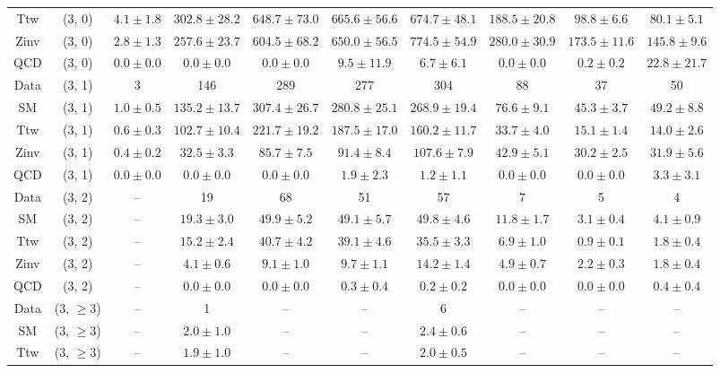 \begin{table}[h!]
{\begin{tabular}{cccccccccc}
	Ttw & (3, 0) & $4.1\pm 1.8$ & $302.8\pm 28.2$ & $648.7\pm 73.0$ & $665.6\pm 56.6$ & $674.7\pm 48.1$ & $188.5\pm 20.8$ & $98.8\pm 6.6$ & $80.1\pm 5.1$ \\[0.5ex] 
	Zinv & (3, 0) & $2.8\pm 1.3$ & $257.6\pm 23.7$ & $604.5\pm 68.2$ & $650.0\pm 56.5$ & $774.5\pm 54.9$ & $280.0\pm 30.9$ & $173.5\pm 11.6$ & $145.8\pm 9.6$ \\[0.5ex] 
	QCD & (3, 0) & $0.0\pm 0.0$ & $0.0\pm 0.0$ & $0.0\pm 0.0$ & $9.5\pm 11.9$ & $6.7\pm 6.1$ & $0.0\pm 0.0$ & $0.2\pm 0.2$ & $22.8\pm 21.7$ \\[0.5ex] 
	Data & (3, 1) & 3 & 146 & 289 & 277 & 304 & 88 & 37 & 50 \\[0.5ex] 
	SM & (3, 1) & $1.0\pm 0.5$ & $135.2\pm 13.7$ & $307.4\pm 26.7$ & $280.8\pm 25.1$ & $268.9\pm 19.4$ & $76.6\pm 9.1$ & $45.3\pm 3.7$ & $49.2\pm 8.8$ \\[0.5ex] 
	Ttw & (3, 1) & $0.6\pm 0.3$ & $102.7\pm 10.4$ & $221.7\pm 19.2$ & $187.5\pm 17.0$ & $160.2\pm 11.7$ & $33.7\pm 4.0$ & $15.1\pm 1.4$ & $14.0\pm 2.6$ \\[0.5ex] 
	Zinv & (3, 1) & $0.4\pm 0.2$ & $32.5\pm 3.3$ & $85.7\pm 7.5$ & $91.4\pm 8.4$ & $107.6\pm 7.9$ & $42.9\pm 5.1$ & $30.2\pm 2.5$ & $31.9\pm 5.6$ \\[0.5ex] 
	QCD & (3, 1) & $0.0\pm 0.0$ & $0.0\pm 0.0$ & $0.0\pm 0.0$ & $1.9\pm 2.3$ & $1.2\pm 1.1$ & $0.0\pm 0.0$ & $0.0\pm 0.0$ & $3.3\pm 3.1$ \\[0.5ex] 
	Data & (3, 2) & -- & 19 & 68 & 51 & 57 & 7 & 5 & 4 \\[0.5ex] 
	SM & (3, 2) & -- & $19.3\pm 3.0$ & $49.9\pm 5.2$ & $49.1\pm 5.7$ & $49.8\pm 4.6$ & $11.8\pm 1.7$ & $3.1\pm 0.4$ & $4.1\pm 0.9$ \\[0.5ex] 
	Ttw & (3, 2) & -- & $15.2\pm 2.4$ & $40.7\pm 4.2$ & $39.1\pm 4.6$ & $35.5\pm 3.3$ & $6.9\pm 1.0$ & $0.9\pm 0.1$ & $1.8\pm 0.4$ \\[0.5ex] 
	Zinv & (3, 2) & -- & $4.1\pm 0.6$ & $9.1\pm 1.0$ & $9.7\pm 1.1$ & $14.2\pm 1.4$ & $4.9\pm 0.7$ & $2.2\pm 0.3$ & $1.8\pm 0.4$ \\[0.5ex] 
	QCD & (3, 2) & -- & $0.0\pm 0.0$ & $0.0\pm 0.0$ & $0.3\pm 0.4$ & $0.2\pm 0.2$ & $0.0\pm 0.0$ & $0.0\pm 0.0$ & $0.4\pm 0.4$ \\[0.5ex] 
	Data & (3, $\ge3$) & -- & 1 & -- & -- & 6 & -- & -- & -- \\[0.5ex] 
	SM & (3, $\ge3$) & -- & $2.0\pm 1.0$ & -- & -- & $2.4\pm 0.6$ & -- & -- & -- \\[0.5ex] 
	Ttw & (3, $\ge3$) & -- & $1.9\pm 1.0$ & -- & -- & $2.0\pm 0.5$ & -- & -- & -- \\[0.5ex] 

\end{tabular}}
\end{table}
